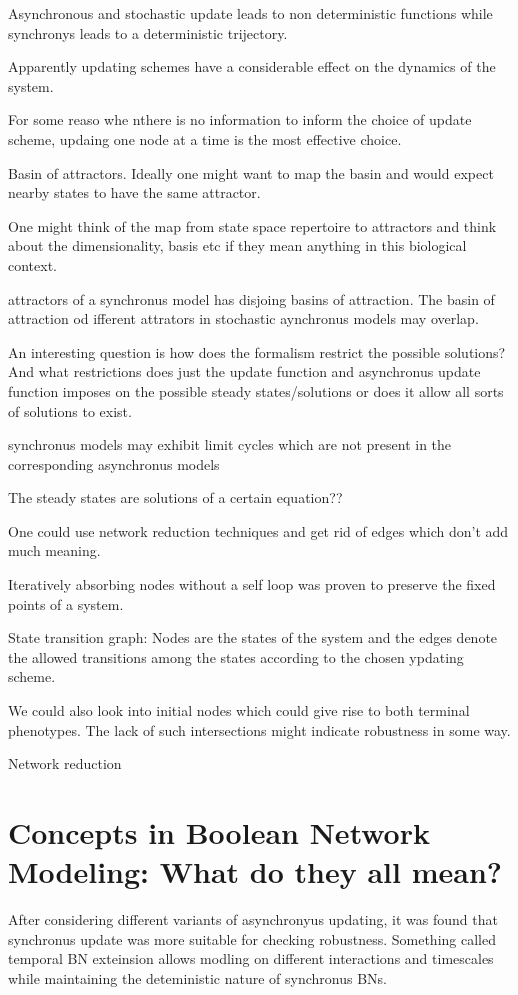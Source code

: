 \documentclass{article}
\begin{document}
Asynchronous and stochastic update leads to non deterministic functions while synchronys leads to a deterministic trijectory. 

Apparently updating schemes have a considerable effect on the dynamics of the system. 

For some reaso whe nthere is no information to inform the choice of update scheme, updaing one node at a time is the most effective choice. 


Basin of attractors. Ideally one might want to map the basin and would expect nearby states to have the same attractor. 


One might think of the map from state space repertoire to attractors and think about the dimensionality, basis etc if they mean anything in this biological context. 


attractors of a synchronus model has disjoing basins of attraction. The basin of attraction od ifferent attrators in stochastic aynchronus models may overlap. 

An interesting question is how does the formalism restrict the possible solutions? And what restrictions does just the update function and asynchronus update function imposes on the possible steady states/solutions or does it allow all sorts of solutions to exist. 

synchronus models may exhibit limit cycles which are not present in the corresponding asynchronus models

The steady states are solutions of a certain equation??

One could use network reduction techniques and get rid of edges which don't add much meaning. 

Iteratively absorbing nodes without a self loop was proven to preserve the fixed points of a system.

State transition graph: Nodes are the states of the system and the edges denote the allowed transitions among the states according to the chosen ypdating scheme. 

We could also look into initial nodes which could give rise to both terminal phenotypes.  The lack of such intersections might indicate robustness in some way. 


Network reduction


\section{Concepts in Boolean Network Modeling: What do they all mean?}
After considering different variants of asynchronyus updating, it was found that synchronus update was more suitable for checking robustness. Something called temporal BN exteinsion allows modling on different interactions and timescales while maintaining the deteministic nature of synchronus BNs. 
\end{document}
